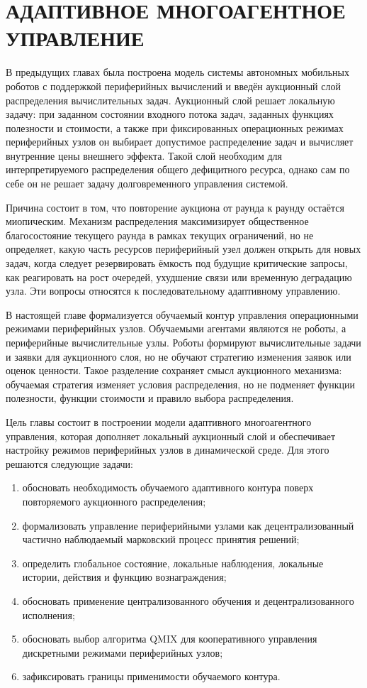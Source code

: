 \chapter{АДАПТИВНОЕ МНОГОАГЕНТНОЕ УПРАВЛЕНИЕ}\label{ch:ch4}

В предыдущих главах была построена модель системы автономных мобильных роботов с поддержкой периферийных вычислений и введён аукционный слой распределения вычислительных задач. Аукционный слой решает локальную задачу: при заданном состоянии входного потока задач, заданных функциях полезности и стоимости, а также при фиксированных операционных режимах периферийных узлов он выбирает допустимое распределение задач и вычисляет внутренние цены внешнего эффекта. Такой слой необходим для интерпретируемого распределения общего дефицитного ресурса, однако сам по себе он не решает задачу долговременного управления системой.

Причина состоит в том, что повторение аукциона от раунда к раунду остаётся миопическим. Механизм распределения максимизирует общественное благосостояние текущего раунда в рамках текущих ограничений, но не определяет, какую часть ресурсов периферийный узел должен открыть для новых задач, когда следует резервировать ёмкость под будущие критические запросы, как реагировать на рост очередей, ухудшение связи или временную деградацию узла. Эти вопросы относятся к последовательному адаптивному управлению.

В настоящей главе формализуется обучаемый контур управления операционными режимами периферийных узлов. Обучаемыми агентами являются не роботы, а периферийные вычислительные узлы. Роботы формируют вычислительные задачи и заявки для аукционного слоя, но не обучают стратегию изменения заявок или оценок ценности. Такое разделение сохраняет смысл аукционного механизма: обучаемая стратегия изменяет условия распределения, но не подменяет функции полезности, функции стоимости и правило выбора распределения.

Цель главы состоит в построении модели адаптивного многоагентного управления, которая дополняет локальный аукционный слой и обеспечивает настройку режимов периферийных узлов в динамической среде. Для этого решаются следующие задачи:
\begin{enumerate}
    \item обосновать необходимость обучаемого адаптивного контура поверх повторяемого аукционного распределения;
    \item формализовать управление периферийными узлами как децентрализованный частично наблюдаемый марковский процесс принятия решений;
    \item определить глобальное состояние, локальные наблюдения, локальные истории, действия и функцию вознаграждения;
    \item обосновать применение централизованного обучения и децентрализованного исполнения;
    \item обосновать выбор алгоритма QMIX для кооперативного управления дискретными режимами периферийных узлов;
    \item зафиксировать границы применимости обучаемого контура.
\end{enumerate}

